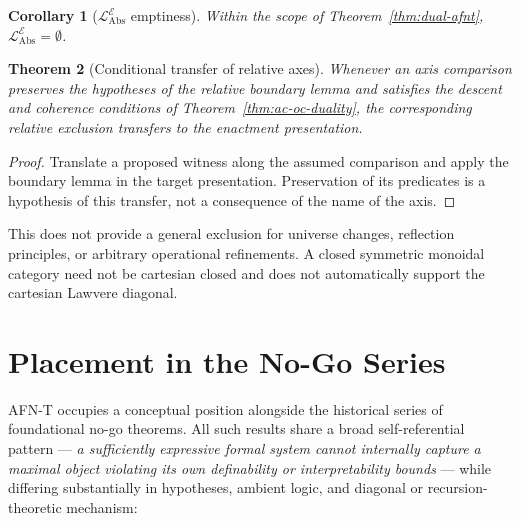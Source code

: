 \documentclass[11pt]{article}
\theoremstyle{plain}
\newtheorem{theorem}{Theorem}[section]
\newtheorem{corollary}[theorem]{Corollary}
\theoremstyle{definition}
\newcommand{\LAbs}{\mathcal{L}_{\mathrm{Abs}}}
\newcommand{\cE}{\mathcal{E}}
\newcommand{\LAbsE}{\LAbs^{\cE}}
\begin{document}
\begin{corollary}[$\LAbsE$ emptiness]\label{cor:level6-empty-cE}
Within the scope of Theorem~\ref{thm:dual-afnt}, $\LAbsE = \emptyset$.
\end{corollary}

\begin{theorem}[Conditional transfer of relative axes]\label{thm:dual-five-axis}
Whenever an axis comparison preserves the hypotheses of the relative boundary lemma and satisfies the descent and coherence conditions of Theorem~\ref{thm:ac-oc-duality}, the corresponding relative exclusion transfers to the enactment presentation.
\end{theorem}
\begin{proof}
Translate a proposed witness along the assumed comparison and apply the boundary lemma in the target presentation. Preservation of its predicates is a hypothesis of this transfer, not a consequence of the name of the axis.
\end{proof}
This does not provide a general exclusion for universe changes, reflection principles, or arbitrary operational refinements. A closed symmetric monoidal category need not be cartesian closed and does not automatically support the cartesian Lawvere diagonal.

\section{Placement in the No-Go Series}\label{sec:series}

AFN-T occupies a conceptual position alongside the historical series of foundational no-go theorems. All such results share a broad self-referential pattern --- \emph{a sufficiently expressive formal system cannot internally capture a maximal object violating its own definability or interpretability bounds} --- while differing substantially in hypotheses, ambient logic, and diagonal or recursion-theoretic mechanism:
\end{document}

